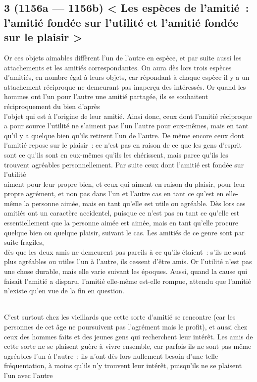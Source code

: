 \documentclass[french,twoside]{book} %
\begin{document}
\subsection[{3 (1156a — 1156b) < Les espèces de l’amitié : l’amitié fondée sur l’utilité et l’amitié fondée sur le plaisir >}]{3 (1156a — 1156b) < Les espèces de l’amitié : l’amitié fondée sur l’utilité et l’amitié fondée sur le plaisir >}
\noindent Or ces objets aimables diffèrent l’un de l’autre en espèce, et par suite aussi les attachements et les amitiés correspondantes. On aura dès lors trois espèces d’amitiés, en nombre égal à leurs objets, car répondant à chaque espèce il y a un attachement réciproque ne demeurant pas inaperçu des intéressés. Or quand les hommes ont l’un pour l’autre une amitié partagée, ils se souhaitent réciproquement du bien d’après \\
l’objet qui est à l’origine de leur amitié. Ainsi donc, ceux dont l’amitié réciproque a pour source l’utilité ne s’aiment pas l’un l’autre pour eux-mêmes, mais en tant qu’il y a quelque bien qu’ils retirent l’un de l’autre. De même encore ceux dont l’amitié repose sur le plaisir : ce n’est pas en raison de ce que les gens d’esprit sont ce qu’ils sont en eux-mêmes qu’ils les chérissent, mais parce qu’ils les trouvent agréables personnellement. Par suite ceux dont l’amitié est fondée sur l’utilité \\
aiment pour leur propre bien, et ceux qui aiment en raison du plaisir, pour leur propre agrément, et non pas dans l’un et l’autre cas en tant ce qu’est en elle-même la personne aimée, mais en tant qu’elle est utile ou agréable. Dès lors ces amitiés ont un caractère accidentel, puisque ce n’est pas en tant ce qu’elle est essentiellement que la personne aimée est aimée, mais en tant qu’elle procure quelque bien ou quelque plaisir, suivant le cas. Les amitiés de ce genre sont par suite fragiles, \\
dès que les deux amis ne demeurent pas pareils à ce qu’ils étaient : s’ils ne sont plus agréables ou utiles l’un à l’autre, ils cessent d’être amis. Or l’utilité n’est pas une chose durable, mais elle varie suivant les époques. Aussi, quand la cause qui faisait l’amitié a disparu, l’amitié elle-même est-elle rompue, attendu que l’amitié n’existe qu’en vue de la fin en question.\par
\\
C’est surtout chez les vieillards que cette sorte d’amitié se rencontre (car les personnes de cet âge ne poursuivent pas l’agrément mais le profit), et aussi chez ceux des hommes faits et des jeunes gens qui recherchent leur intérêt. Les amis de cette sorte ne se plaisent guère à vivre ensemble, car parfois ils ne sont pas même agréables l’un à l’autre ; ils n’ont dès lors nullement besoin d’une telle fréquentation, à moins qu’ils n’y trouvent leur intérêt, puisqu’ils ne se plaisent l’un avec l’autre \\
\end{document}
